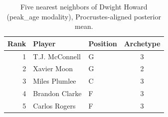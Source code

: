\begin{table}[htbp]
  \centering\small
  \begin{tabular}{rllc}
    \toprule
    Rank & Player & Position & Archetype \\
    \midrule
    1 & T.J. McConnell & G & 3 \\
    2 & Xavier Moon & G & 2 \\
    3 & Miles Plumlee & C & 3 \\
    4 & Brandon Clarke & F & 3 \\
    5 & Carlos Rogers & F & 3 \\
    \bottomrule
  \end{tabular}
  \caption{Five nearest neighbors of Dwight Howard (peak_age modality), Procrustes-aligned posterior mean.}
  \label{tab:Dwight_Howard_neighbors_peak_age}
\end{table}


